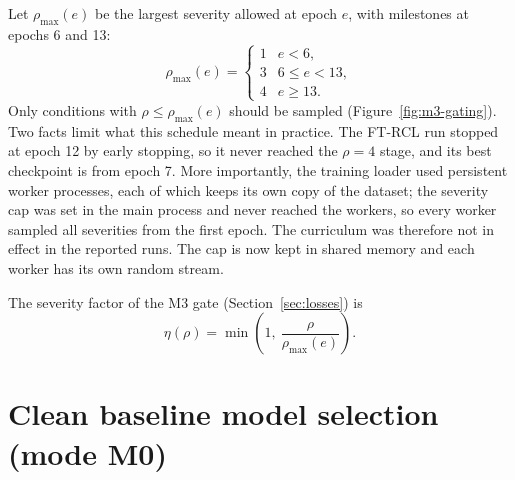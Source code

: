 Let $\rho_{\max}(e)$ be the largest severity allowed at epoch $e$, with milestones at epochs 6 and 13:
\begin{equation}
\rho_{\max}(e) = \begin{cases}
1 & e < 6, \\
3 & 6 \le e < 13, \\
4 & e \ge 13 .
\end{cases}
\label{eq:curriculum}
\end{equation}
Only conditions with $\rho \le \rho_{\max}(e)$ should be sampled (Figure~\ref{fig:m3-gating}). Two facts limit what this schedule meant in practice. The FT-RCL run stopped at epoch 12 by early stopping, so it never reached the $\rho=4$ stage, and its best checkpoint is from epoch 7. More importantly, the training loader used persistent worker processes, each of which keeps its own copy of the dataset; the severity cap was set in the main process and never reached the workers, so every worker sampled all severities from the first epoch. The curriculum was therefore not in effect in the reported runs. The cap is now kept in shared memory and each worker has its own random stream.


The severity factor of the M3 gate (Section~\ref{sec:losses}) is
\begin{equation}
\eta(\rho) = \min\!\left(1,\ \frac{\rho}{\rho_{\max}(e)}\right).
\label{eq:eta}
\end{equation}

\section{Clean baseline model selection (mode M0)}
\label{sec:baseline}

